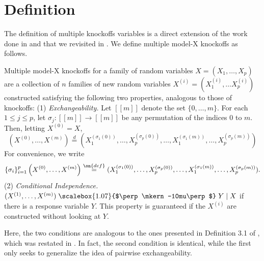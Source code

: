 \documentclass[11pt,reqno]{report}
\theoremstyle{definition}
\newcommand{\indep}{\mathrel{\text{\scalebox{1.07}{$\perp\mkern-10mu\perp$}}}}
\numberwithin{equation}{section}
\begin{document}
\section{Definition}
The definition of multiple knockoffs variables is a direct extension of the work done in \cite{knockoffs} and \cite{panning} that we revisited in . We define multiple model-X knockoffs as follows.
\begin{defn}
Multiple model-X knockoffs for a family of random variables $X = (X_1, \ldots, X_p)$ are a collection of $n$ families of new random variables $X^{(i)} = (X^{(i)}_1, \ldots X^{(i)}_p)$ constructed satisfying the following two properties, analogous to those of knockoffs: (1) \emph{Exchangeability.} Let $[[m]]$ denote the set $\{ 0, \ldots, m \}$. For each $1 \leq j \leq p$, let $\sigma_j : [[m]] \to [[m]]$ be any permutation of the indices $0$ to $m$. Then, letting $X^{(0)} = X$,
\begin{equation}
(X^{(0)}, \ldots, X^{(m)}) \overset{d}= (X^{(\sigma_1(0))}_{1}, \ldots, X^{(\sigma_p(0))}_{p}, \ldots, X^{(\sigma_1(m))}_{1}, \ldots, X^{(\sigma_p(m))}_{p}  )
\end{equation}
For convenience, we write
\begin{equation}
\{ \sigma_i \}_{i=1}^p \left( X^{(0)}, \ldots, X^{(m)} \right) \overset{\on{def}}{=} (X^{(\sigma_1(0))}_{1}, \ldots, X^{(\sigma_p(0))}_{p}, \ldots, X^{(\sigma_1(m))}_{1}, \ldots, X^{(\sigma_p(m))}_{p}  ).
\end{equation}
(2) \emph{Conditional Independence.} $(X^{(1)}, \ldots, X^{(m)}) \indep Y \mid X$ if there is a response variable $Y$. This property is guaranteed if the $X^{(i)}$ are constructed without looking at $Y$.
\end{defn}
Here, the two conditions are analogous to the ones presented in Definition 3.1 of \cite{panning}, which was restated in . In fact, the second condition is identical, while the first only seeks to generalize the idea of pairwise exchangeability.
\end{document}
